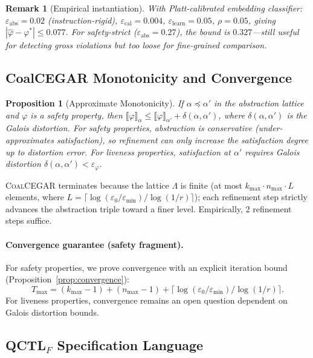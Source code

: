 \documentclass[11pt]{article}
\newtheorem{proposition}[theorem]{Proposition}
\newtheorem{remark}[theorem]{Remark}
\newcommand{\coalcegar}{\textsc{CoalCEGAR}}
\begin{document}
\begin{remark}[Empirical instantiation]
With Platt-calibrated embedding classifier:
$\varepsilon_{\mathrm{abs}} = 0.02$ (instruction-rigid),
$\varepsilon_{\mathrm{cal}} = 0.004$,
$\varepsilon_{\mathrm{learn}} = 0.05$, $\rho = 0.05$,
giving $|\hat{\varphi} - \varphi^*| \le 0.077$.
For safety-strict ($\varepsilon_{\mathrm{abs}} = 0.27$),
the bound is $0.327$---still useful for detecting gross violations
but too loose for fine-grained comparison.
\end{remark}

\subsection{CoalCEGAR Monotonicity and Convergence}

\begin{proposition}[Approximate Monotonicity]\label{prop:monotonicity}
If $\alpha \preceq \alpha'$ in the abstraction lattice and $\varphi$
is a safety property, then
$\llbracket \varphi \rrbracket_{\alpha} \le
\llbracket \varphi \rrbracket_{\alpha'} + \delta(\alpha, \alpha')$,
where $\delta(\alpha,\alpha')$ is the Galois distortion.
For safety properties, abstraction is conservative
(under-approximates satisfaction), so refinement can only
increase the satisfaction degree up to distortion error.
For liveness properties, satisfaction at
$\alpha'$ requires Galois distortion
$\delta(\alpha, \alpha') < \varepsilon_\varphi$.
\end{proposition}

\coalcegar{} terminates because the lattice $\Lambda$ is finite
(at most $k_{\max} \cdot n_{\max} \cdot L$ elements, where
$L = \lceil \log(\varepsilon_0/\varepsilon_{\min})/\log(1/r) \rceil$);
each refinement step strictly advances the abstraction triple toward
a finer level.  Empirically, 2 refinement steps suffice.

\paragraph{Convergence guarantee (safety fragment).}
For safety properties, we prove convergence with an explicit
iteration bound (Proposition~\ref{prop:convergence}):
\[
  T_{\max} = (k_{\max} {-} 1) + (n_{\max} {-} 1) +
  \bigl\lceil \log(\varepsilon_0/\varepsilon_{\min}) /
  \log(1/r) \bigr\rceil.
\]
For liveness properties, convergence remains an
open question dependent on Galois distortion bounds.

\subsection{QCTL$_F$ Specification Language}
\end{document}
